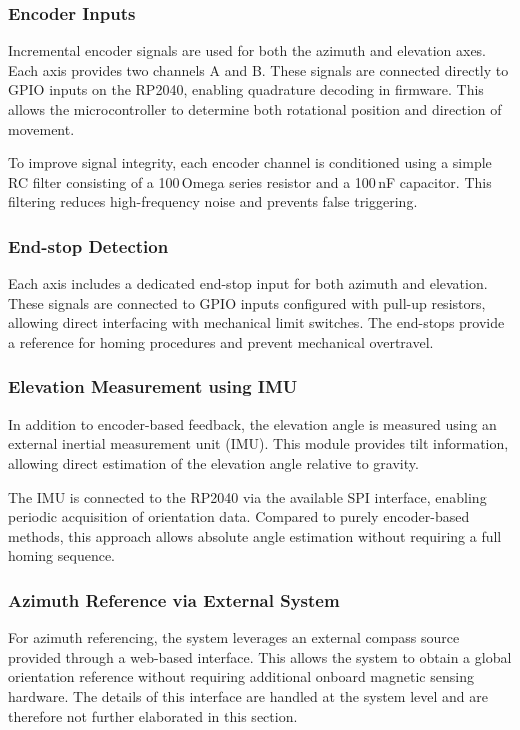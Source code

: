 \subsubsection{Encoder Inputs}

Incremental encoder signals are used for both the azimuth and elevation axes. Each axis provides two channels A and B. These signals are connected directly to GPIO inputs on the RP2040, enabling quadrature decoding in firmware. This allows the microcontroller to determine both rotational position and direction of movement.

To improve signal integrity, each encoder channel is conditioned using a simple RC filter consisting of a 100\,Omega series resistor and a 100\,nF capacitor. This filtering reduces high-frequency noise and prevents false triggering.

\subsubsection{End-stop Detection}

Each axis includes a dedicated end-stop input for both azimuth and elevation. These signals are connected to GPIO inputs configured with pull-up resistors, allowing direct interfacing with mechanical limit switches. The end-stops provide a reference for homing procedures and prevent mechanical overtravel.

\subsubsection{Elevation Measurement using IMU}

In addition to encoder-based feedback, the elevation angle is measured using an external inertial measurement unit (IMU). This module provides tilt information, allowing direct estimation of the elevation angle relative to gravity.

The IMU is connected to the RP2040 via the available SPI interface, enabling periodic acquisition of orientation data. Compared to purely encoder-based methods, this approach allows absolute angle estimation without requiring a full homing sequence.

\subsubsection{Azimuth Reference via External System}

For azimuth referencing, the system leverages an external compass source provided through a web-based interface. This allows the system to obtain a global orientation reference without requiring additional onboard magnetic sensing hardware. The details of this interface are handled at the system level and are therefore not further elaborated in this section.

